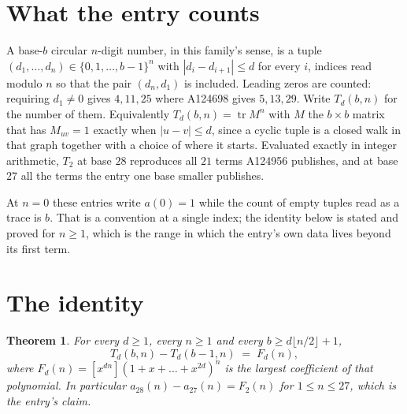 \documentclass[11pt,a4paper]{article}
\theoremstyle{plain}
\newtheorem{theorem}{Theorem}
\theoremstyle{definition}
\begin{document}
\section{What the entry counts}

A base-$b$ circular $n$-digit number, in this family's sense, is a tuple
$(d_1,\dots,d_n)\in\{0,1,\dots,b-1\}^{n}$ with $|d_i-d_{i+1}|\le d$ for every $i$, indices
read modulo $n$ so that the pair $(d_n,d_1)$ is included. Leading zeros are counted: requiring
$d_1\ne0$ gives $4,11,25$ where A124698 gives $5,13,29$. Write $T_d(b,n)$ for the number of
them. Equivalently $T_d(b,n)=\operatorname{tr}M^{n}$ with $M$ the $b\times b$ matrix that has
$M_{uv}=1$ exactly when $|u-v|\le d$, since a cyclic tuple is a closed walk in that graph
together with a choice of where it starts. Evaluated exactly in integer arithmetic, $T_{2}$
at base $28$ reproduces all $21$ terms A124956 publishes, and at base $27$ all the
terms the entry one base smaller publishes.

At $n=0$ these entries write $a(0)=1$ while the count of empty tuples read as a trace is $b$.
That is a convention at a single index; the identity below is stated and proved for $n\ge1$,
which is the range in which the entry's own data lives beyond its first term.

\section{The identity}

\begin{theorem}
For every $d\ge1$, every $n\ge1$ and every $b\ge d\lfloor n/2\rfloor+1$,
\[
T_d(b,n)-T_d(b-1,n)\;=\;F_d(n),
\]
where $F_d(n)=[x^{dn}](1+x+\dots+x^{2d})^{n}$ is the largest coefficient of that
polynomial. In particular $a_{28}(n)-a_{27}(n)=F_{2}(n)$ for $1\le n\le27$, which
is the entry's claim.
\end{theorem}
\end{document}
